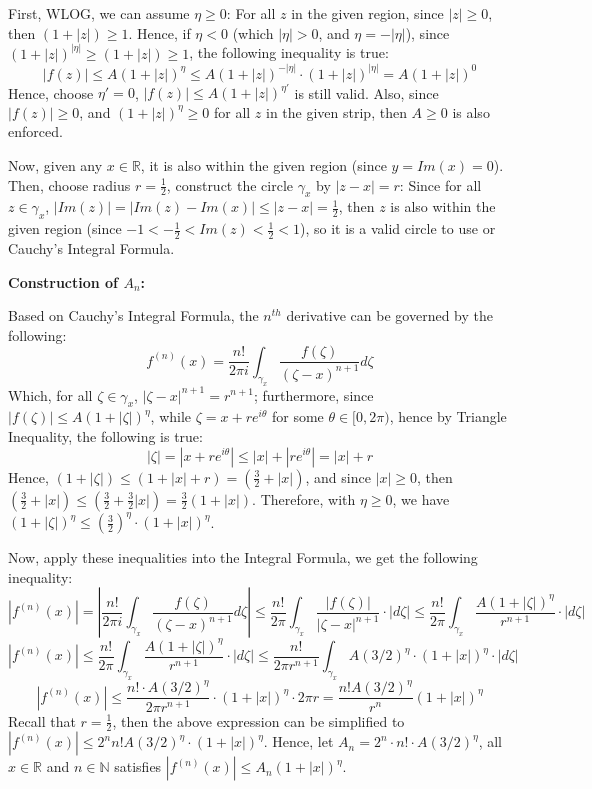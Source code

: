 \documentclass{article}
\begin{document}
First, WLOG, we can assume $\eta\geq 0$: For all $z$ in the given region, since $|z|\geq 0$, then $(1+|z|)\geq 1$.
Hence, if $\eta<0$ (which $|\eta|>0$, and $\eta=-|\eta|$), since $(1+|z|)^{|\eta|} \geq (1+|z|)\geq 1$, the following inequality is true:
$$|f(z)| \leq A(1+|z|)^\eta\leq A(1+|z|)^{-|\eta|}\cdot(1+|z|)^{|\eta|}=A(1+|z|)^0$$
Hence, choose $\eta'=0$, $|f(z)| \leq A(1+|z|)^{\eta'}$ is still valid. Also, since $|f(z)|\geq 0$, and $(1+|z|)^\eta\geq 0$ for all $z$ in the given strip,
then $A\geq 0$ is also enforced.

\hfill

Now, given any $x\in\mathbb{R}$, it is also within the given region (since $y=Im(x)=0$). Then, choose radius $r=\frac{1}{2}$, 
construct the circle $\gamma_x$ by $|z-x|=r$: Since for all $z\in\gamma_x$, $|Im(z)| = |Im(z)-Im(x)| \leq |z-x| =\frac{1}{2}$,
then $z$ is also within the given region (since $-1<-\frac{1}{2}<Im(z)<\frac{1}{2}<1$), so it is a valid circle to use or Cauchy's Integral Formula.

\hfill

\textbf{Construction of $A_n$:}

Based on Cauchy's Integral Formula, the $n^{th}$ derivative can be governed by the following:
$$f^{(n)}(x)=\frac{n!}{2\pi i}\int_{\gamma_{x}}\frac{f(\zeta)}{(\zeta-x)^{n+1}}d\zeta$$
Which, for all $\zeta\in \gamma_x$, $|\zeta-x|^{n+1}=r^{n+1}$; furthermore, since $|f(\zeta)|\leq A(1+|\zeta|)^\eta$, while $\zeta = x+re^{i\theta}$ for some $\theta\in [0,2\pi)$,
hence by Triangle Inequality, the following is true:
$$|\zeta| = |x+re^{i\theta}| \leq |x|+|re^{i\theta}|=|x|+r$$
Hence, $(1+|\zeta|)\leq (1+|x|+r) = (\frac{3}{2}+|x|)$, and since $|x|\geq 0$, then $(\frac{3}{2}+|x|)\leq(\frac{3}{2}+\frac{3}{2}|x|)= \frac{3}{2}(1+|x|)$.
Therefore, with $\eta\geq 0$, we have $(1+|\zeta|)^\eta \leq (\frac{3}{2})^\eta \cdot (1+|x|)^\eta$.

\hfill

Now, apply these inequalities into the Integral Formula, we get the following inequality:
$$|f^{(n)}(x)| = \left|\frac{n!}{2\pi i}\int_{\gamma_{x}}\frac{f(\zeta)}{(\zeta-x)^{n+1}}d\zeta\right| \leq \frac{n!}{2\pi}\int_{\gamma_x}\frac{|f(\zeta)|}{|\zeta-x|^{n+1}}\cdot|d\zeta|\leq \frac{n!}{2\pi}\int_{\gamma_x}\frac{A(1+|\zeta|)^\eta}{r^{n+1}}\cdot|d\zeta|$$
$$|f^{(n)}(x)|\leq \frac{n!}{2\pi}\int_{\gamma_x}\frac{A(1+|\zeta|)^\eta}{r^{n+1}}\cdot|d\zeta| \leq \frac{n!}{2\pi r^{n+1}}\int_{\gamma_x}A(3/2)^\eta\cdot(1+|x|)^\eta\cdot |d\zeta| $$
$$|f^{(n)}(x)|\leq \frac{n!\cdot A(3/2)^\eta}{2\pi r^{n+1}}\cdot (1+|x|)^\eta\cdot 2\pi r = \frac{n! A(3/2)^\eta}{r^n}(1+|x|)^\eta$$
Recall that $r=\frac{1}{2}$, then the above expression can be simplified to $|f^{(n)}(x)|\leq 2^nn!A(3/2)^\eta\cdot (1+|x|)^\eta$.
Hence, let $A_n = 2^n\cdot n!\cdot A(3/2)^\eta$, all $x\in\mathbb{R}$ and $n\in\mathbb{N}$ satisfies $|f^{(n)}(x)|\leq A_n(1+|x|)^\eta$.
\end{document}
